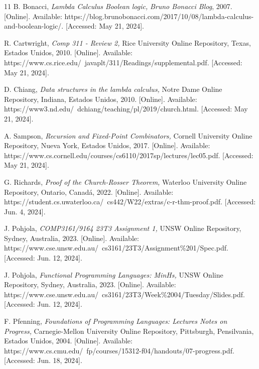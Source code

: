 \begin{thebibliography}{11}
    \label{sec:110}
    \hypertarget{110}{}
    B. Bonacci, \textit{Lambda Calculus Boolean logic, }\textit{Bruno Bonacci Blog}, 2007. [Online]. Available: https://blog.brunobonacci.com/2017/10/08/lambda-calculus-and-boolean-logic/. [Accessed: May 21, 2024].

    \label{sec:111}
    \hypertarget{111}{}
    R. Cartwright, \textit{Comp 311 - Review 2, }Rice University Online Repository, Texas, Estados Unidos, 2010. [Online]. Available: https://www.cs.rice.edu/~javaplt/311/Readings/supplemental.pdf. [Accessed: May 21, 2024].

    \label{sec:112}
    \hypertarget{112}{}
    D. Chiang, \textit{Data structures in the lambda calculus, } Notre Dame Online Repository, Indiana, Estados Unidos, 2010. [Online]. Available: https://www3.nd.edu/~dchiang/teaching/pl/2019/church.html. [Accessed: May 21, 2024].

    \label{sec:113}
    \hypertarget{113}{}
    A. Sampson, \textit{Recursion and Fixed-Point Combinators, } Cornell University Online Repository, Nueva York, Estados Unidos, 2017. [Online]. Available: https://www.cs.cornell.edu/courses/cs6110/2017sp/lectures/lec05.pdf. [Accessed: May 21, 2024].

    \label{sec:114}
    \hypertarget{114}{}
    G. Richards, \textit{Proof of the Church-Rosser Theorem, } Waterloo University Online Repository, Ontario, Canadá, 2022. [Online]. Available: https://student.cs.uwaterloo.ca/~cs442/W22/extras/c-r-thm-proof.pdf. [Accessed: Jun. 4, 2024].

    \label{sec:115}
    \hypertarget{115}{}
    J. Pohjola, \textit{COMP3161/9164 23T3 Assignment 1, } UNSW Online Repository, Sydney, Australia, 2023. [Online]. Available: https://www.cse.unsw.edu.au/~cs3161/23T3/Assignment\%201/Spec.pdf. [Accessed: Jun. 12, 2024].

    \label{sec:116}
    \hypertarget{116}{}
    J. Pohjola, \textit{Functional Programming Languages: MinHs, } UNSW Online Repository, Sydney, Australia, 2023. [Online]. Available: https://www.cse.unsw.edu.au/~cs3161/23T3/Week\%2004/Tuesday/Slides.pdf. [Accessed: Jun. 12, 2024].

    \label{sec:117}
    \hypertarget{117}{}
    F. Pfenning, \textit{Foundations of Programming Languages: Lectures Notes on Progress, } Carnegie-Mellon University Online Repository, Pittsburgh, Pensilvania, Estados Unidos, 2004. [Online]. Available: https://www.cs.cmu.edu/~fp/courses/15312-f04/handouts/07-progress.pdf. [Accessed: Jun. 18, 2024].


\end{thebibliography}
